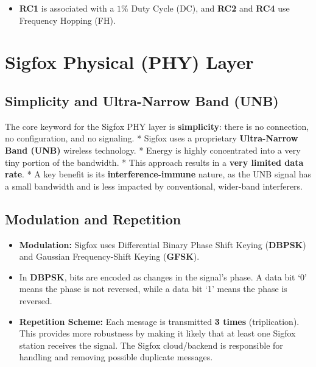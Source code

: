 \documentclass[a4paper, 12pt]{book} %
\begin{document}
\begin{itemize}
\tightlist
\item
  \textbf{RC1} is associated with a \(1\%\) Duty Cycle (DC), and
  \textbf{RC2} and \textbf{RC4} use Frequency Hopping (FH).
\end{itemize}

\chapter{Sigfox Physical (PHY) Layer}\label{sigfox-physical-phy-layer}

\section{Simplicity and Ultra-Narrow Band
(UNB)}\label{simplicity-and-ultra-narrow-band-unb}

The core keyword for the Sigfox PHY layer is \textbf{simplicity}: there
is no connection, no configuration, and no signaling. * Sigfox uses a
proprietary \textbf{Ultra-Narrow Band (UNB)} wireless technology. *
Energy is highly concentrated into a very tiny portion of the bandwidth.
* This approach results in a \textbf{very limited data rate}. * A key
benefit is its \textbf{interference-immune} nature, as the UNB signal
has a small bandwidth and is less impacted by conventional, wider-band
interferers.

\section{Modulation and Repetition}\label{modulation-and-repetition}

\begin{itemize}
\tightlist
\item
  \textbf{Modulation:} Sigfox uses Differential Binary Phase Shift
  Keying (\textbf{DBPSK}) and Gaussian Frequency-Shift Keying
  (\textbf{GFSK}).
\item
  In \textbf{DBPSK}, bits are encoded as changes in the signal's phase.
  A data bit `0' means the phase is not reversed, while a data bit `1'
  means the phase is reversed.
\item
  \textbf{Repetition Scheme:} Each message is transmitted \textbf{3
  times} (triplication). This provides more robustness by making it
  likely that at least one Sigfox station receives the signal. The
  Sigfox cloud/backend is responsible for handling and removing possible
  duplicate messages.
\end{itemize}
\end{document}
